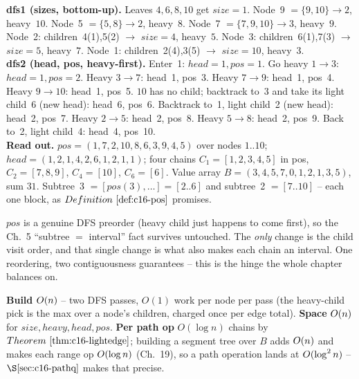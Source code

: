 \begin{tracebox}
\textbf{dfs1 (sizes, bottom-up).} Leaves \(4,6,8,10\) get \(\mathit{size}=1\).  Node~9 \(=\{9,10\}\to2\), heavy~\(10\). Node~5 \(=\{5,8\}\to2\), heavy~\(8\). Node~7 \(=\{7,9,10\}\to3\), heavy~\(9\). Node~2: children~4(1),5(2) \(\to\) \(\mathit{size}=4\), heavy~\(5\). Node~3: children~6(1),7(3) \(\to\) \(\mathit{size}=5\), heavy~\(7\). Node~1: children~2(4),3(5) \(\to\) \(\mathit{size}=10\), heavy~\(3\).\\
\textbf{dfs2 (head, pos, heavy-first).} Enter~1: \(\mathit{head}=1,\mathit{pos}=1\). Go heavy \(1\!\to\!3\): \(\mathit{head}=1,\mathit{pos}=2\). Heavy \(3\!\to\!7\): head~1, pos~3. Heavy \(7\!\to\!9\): head~1, pos~4. Heavy \(9\!\to\!10\): head~1, pos~5. \(10\) has no child; backtrack to~3 and take its light child~6 (new head): head~6, pos~6. Backtrack to~1, light child~2 (new head): head~2, pos~7. Heavy \(2\!\to\!5\): head~2, pos~8. Heavy \(5\!\to\!8\): head~2, pos~9. Back to~2, light child~4: head~4, pos~10.\\
\textbf{Read out.} \(\mathit{pos}=(1,7,2,10,8,6,3,9,4,5)\) over nodes \(1..10\); \(\mathit{head}=(1,2,1,4,2,6,1,2,1,1)\); four chains \(C_1=[1,2,3,4,5]\) in pos, \(C_2=[7,8,9]\), \(C_4=[10]\), \(C_6=[6]\).  Value array \(B=(3,4,5,7,0,1,2,1,3,5)\), sum \(31\).  Subtree~3 \(=[\mathit{pos}(3),\dots]= [2..6]\) and subtree~2 \(=[7..10]\) -- each one block, as \(\defref{c16-pos}\) promises.
\end{tracebox}

\begin{observation}
\(\mathit{pos}\) is a genuine DFS preorder (heavy child just happens to come first), so the Ch.~5 ``subtree \(=\) interval'' fact survives untouched.  The \emph{only} change is the child visit order, and that single change is what also makes each chain an interval.  One reordering, two contiguousness guarantees -- this is the hinge the whole chapter balances on.
\end{observation}

\begin{complexitybox}
\textbf{Build} \(O(n)\) -- two DFS passes, \(O(1)\) work per node per pass (the heavy-child pick is the max over a node's children, charged once per edge total). \textbf{Space} \(O(n)\) for \(\mathit{size},\mathit{heavy},\mathit{head},\mathit{pos}\). \textbf{Per path op} \(O(\log n)\) chains by \(\thmref{c16-lightedge}\); building a segment tree over \(B\) adds \(O(n)\) and makes each range op \(O(\log n)\) (Ch.~19), so a path operation lands at \(O(\log^2 n)\) -- \(\secref{c16-pathq}\) makes that precise.
\end{complexitybox}

